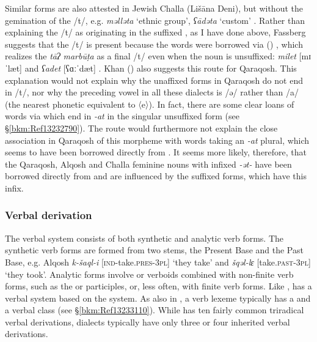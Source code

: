 \documentclass[output=paper]{langsci/langscibook}
\begin{document}
Similar forms are also attested in Jewish Challa (Lišāna Deni), but without the gemination of the /t/, e.g. \textit{məlləta} ‘ethnic group’, \textit{ʕādəta} ‘custom’ \citep[52]{Fassberg2010}. Rather than explaining the /t/ as originating in the  suffixed , as I have done above, Fassberg suggests that the /t/ is present because the words were borrowed via () , which realizes the \textit{tāʔ} \textit{marbūṭa} as a final /t/ even when the noun is unsuffixed: \textit{milet} [mɪˈlæt] and \textit{ʕadet} [ʕɑːˈdæt] \citep[387]{Chyet2003}. Khan (\citeyear[206]{Khan2002}) also suggests this route for Qaraqosh. This explanation would not explain why the unaffixed forms in Qaraqosh do not end in /t/, nor why the preceding vowel in all these dialects is /ə/ rather than /a/ (the nearest phonetic equivalent to  〈e〉). In fact, there are some clear loans of  words via  which end in \textit{{}-at} in the singular unsuffixed form (see §\ref{bkm:Ref13232790}). The  route would furthermore not explain the close association in Qaraqosh of this morpheme with words taking an \textit{\nobreakdash-at} plural, which seems to have been borrowed directly from . It seems more likely, therefore, that the Qaraqosh, Alqosh and Challa feminine nouns with infixed \textit{\nobreakdash-ət\nobreakdash-} have been borrowed directly from  and are influenced by the  suffixed forms, which have this infix.

\largerpage

\subsubsection{\label{bkm:Ref13233345}Verbal derivation}

The  verbal system consists of both synthetic and analytic verb forms. The synthetic verb forms are formed from two stems, the Present Base and the Past Base, e.g.  Alqosh \textit{k\nobreakdash-šaql\nobreakdash-i} [\textsc{ind\nobreakdash-}take.\textsc{pres\nobreakdash-3pl]} ‘they take’ and \textit{šqəl\nobreakdash-lɛ} [take.\textsc{past\nobreakdash-3pl}] ‘they took’. Analytic forms involve  or verboids combined with non-finite verb forms, such as the  or participles, or, less often, with finite verb forms. Like ,  has a verbal system based on the  system. As also in , a verb lexeme typically has a   and a verbal  class (see §\ref{bkm:Ref13233110}). While   has ten fairly common triradical verbal derivations,  dialects typically have only three or four inherited verbal derivations.
\end{document}
